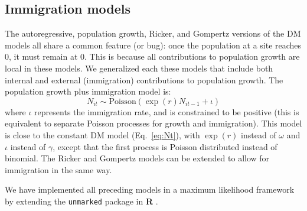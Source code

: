 \documentclass[12pt]{article}
\begin{document}
\subsection{Immigration models}

The autoregressive, population growth, Ricker, and Gompertz
versions of the DM models all share a common feature (or bug):
once the population at a site reaches 0, it must remain at 0.
This is because all contributions to population growth are
local in these models.  We generalized each these models that
include both internal and external (immigration) contributions
to population growth.  The population growth plus immigration
model is:
\begin{equation}
  N_{it} \sim \text{Poisson}(\exp(r)N_{it-1} + \iota)
  \label{eq:expimm2}
\end{equation}
where $\iota$ represents the immigration rate, and is constrained to be
positive (this is equivalent to separate Poisson processes for growth and
immigration).  This model is close to
the constant DM model (Eq.~\ref{eq:Nt}), with $\exp(r)$ instead of $\omega$
and $\iota$ instead of $\gamma$, except that the first
process is Poisson distributed instead of binomial. The Ricker and
Gompertz models can be extended to allow for immigration in the same
way.

We have implemented all preceding models in
a maximum likelihood framework by extending the \texttt{unmarked} package
\citep{fiske_chandler:2011} in \textbf{R} \citep{R-2012}.
\end{document}
